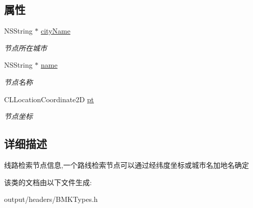 \subsection*{属性}
\begin{DoxyCompactItemize}
\item 
\hypertarget{interface_b_m_k_plan_node_ae6181a2e46740e8422a0b0820eedd0bb}{}N\+S\+String $\ast$ \hyperlink{interface_b_m_k_plan_node_ae6181a2e46740e8422a0b0820eedd0bb}{city\+Name}\label{interface_b_m_k_plan_node_ae6181a2e46740e8422a0b0820eedd0bb}

\begin{DoxyCompactList}\small\item\em 节点所在城市 \end{DoxyCompactList}\item 
\hypertarget{interface_b_m_k_plan_node_afe487565841e6361610e53d77af75f65}{}N\+S\+String $\ast$ \hyperlink{interface_b_m_k_plan_node_afe487565841e6361610e53d77af75f65}{name}\label{interface_b_m_k_plan_node_afe487565841e6361610e53d77af75f65}

\begin{DoxyCompactList}\small\item\em 节点名称 \end{DoxyCompactList}\item 
\hypertarget{interface_b_m_k_plan_node_a1fa1ff65e104926cc145168df5261136}{}C\+L\+Location\+Coordinate2\+D \hyperlink{interface_b_m_k_plan_node_a1fa1ff65e104926cc145168df5261136}{pt}\label{interface_b_m_k_plan_node_a1fa1ff65e104926cc145168df5261136}

\begin{DoxyCompactList}\small\item\em 节点坐标 \end{DoxyCompactList}\end{DoxyCompactItemize}


\subsection{详细描述}
线路检索节点信息,一个路线检索节点可以通过经纬度坐标或城市名加地名确定 

该类的文档由以下文件生成\+:\begin{DoxyCompactItemize}
\item 
output/headers/B\+M\+K\+Types.\+h\end{DoxyCompactItemize}
